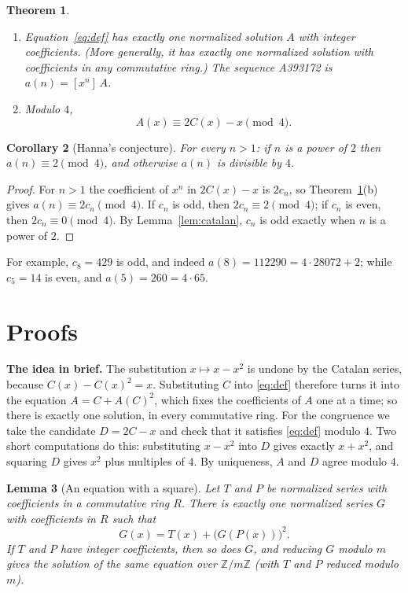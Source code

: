 \documentclass[11pt,a4paper]{article}
\newtheorem{theorem}{Theorem}[section]
\newtheorem{lemma}[theorem]{Lemma}
\newtheorem{corollary}[theorem]{Corollary}
\theoremstyle{definition}
\theoremstyle{remark}
\newcommand{\Z}{\mathbb{Z}}
\newcommand{\coeff}[2]{[x^{#1}]\,#2}
\newcommand{\para}[1]{\par\medskip\noindent\textbf{#1}\enspace}
\begin{document}
\begin{theorem}\label{thm:main}
\begin{enumerate}[label=(\alph*)]
\item Equation~\eqref{eq:def} has exactly one normalized solution $A$ with integer coefficients. (More generally, it
has exactly one normalized solution with coefficients in any commutative ring.) The sequence A393172 is
$a(n)=\coeff{n}{A}$.
\item Modulo $4$,
\[
A(x)\equiv 2C(x)-x\pmod 4 .
\]
\end{enumerate}
\end{theorem}

\begin{corollary}[Hanna's conjecture]\label{cor:conj}
For every $n>1$: if $n$ is a power of $2$ then $a(n)\equiv2\pmod4$, and otherwise $a(n)$ is divisible by $4$.
\end{corollary}

\begin{proof}
For $n>1$ the coefficient of $x^n$ in $2C(x)-x$ is $2c_n$, so Theorem~\ref{thm:main}(b) gives $a(n)\equiv2c_n\pmod4$.
If $c_n$ is odd, then $2c_n\equiv2\pmod4$; if $c_n$ is even, then $2c_n\equiv0\pmod4$. By Lemma~\ref{lem:catalan},
$c_n$ is odd exactly when $n$ is a power of $2$.
\end{proof}

For example, $c_8=429$ is odd, and indeed $a(8)=112290=4\cdot28072+2$; while $c_5=14$ is even, and $a(5)=260=4\cdot65$.

\section{Proofs}\label{sec:proofs}

\para{The idea in brief.} The substitution $x\mapsto x-x^2$ is undone by the Catalan series, because
$C(x)-C(x)^2=x$. Substituting $C$ into \eqref{eq:def} therefore turns it into the equation $A=C+A(C)^2$, which fixes
the coefficients of $A$ one at a time; so there is exactly one solution, in every commutative ring. For the congruence we
take the candidate $D=2C-x$ and check that it satisfies \eqref{eq:def} modulo $4$. Two short computations do this:
substituting $x-x^2$ into $D$ gives exactly $x+x^2$, and squaring $D$ gives $x^2$ plus multiples of $4$. By uniqueness,
$A$ and $D$ agree modulo $4$.

\begin{lemma}[An equation with a square]\label{lem:square}
Let $T$ and $P$ be normalized series with coefficients in a commutative ring $R$. There is exactly one normalized
series $G$ with coefficients in $R$ such that
\[
G(x)=T(x)+\bigl(G(P(x))\bigr)^2 .
\]
If $T$ and $P$ have integer coefficients, then so does $G$, and reducing $G$ modulo $m$ gives the solution of the same
equation over $\Z/m\Z$ (with $T$ and $P$ reduced modulo $m$).
\end{lemma}
\end{document}
